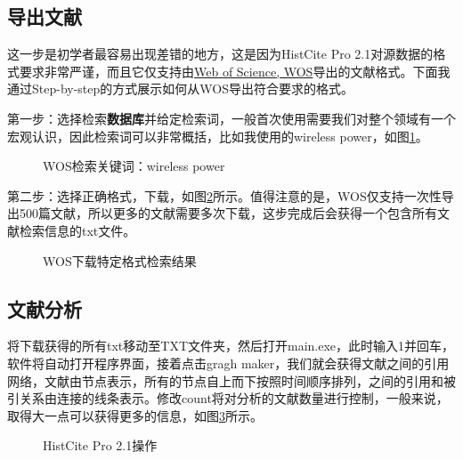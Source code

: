 \documentclass[UTF8,oneside]{ctexbook}
\begin{document}
\subsection{导出文献}
这一步是初学者最容易出现差错的地方，这是因为HistCite Pro 2.1对源数据的格式要求非常严谨，而且它仅支持由\href{http://apps.webofknowledge.com/UA_GeneralSearch_input.do?product=UA&search_mode=GeneralSearch&SID=6DZxzSnnYfZdzYcWxLr&preferencesSaved=}{Web of Science, WOS}导出的文献格式。下面我通过Step-by-step的方式展示如何从WOS导出符合要求的格式。

第一步：选择检索{\bf 数据库}并给定检索词，一般首次使用需要我们对整个领域有一个宏观认识，因此检索词可以非常概括，比如我使用的wireless power，如图\ref{fig:1}。

\begin{figure}[!htb]
	\centering
	\vspace{-0.3cm}
	\caption{WOS检索关键词：wireless power}\label{fig:1}
\end{figure}

第二步：选择正确格式，下载，如图\ref{fig:2}所示。值得注意的是，WOS仅支持一次性导出500篇文献，所以更多的文献需要多次下载，这步完成后会获得一个包含所有文献检索信息的txt文件。

\begin{figure}[!htb]
	\centering
	\vspace{-0.3cm}
	\caption{WOS下载特定格式检索结果}\label{fig:2}
\end{figure}

\subsection{文献分析}
将下载获得的所有txt移动至TXT文件夹，然后打开main.exe，此时输入1并回车，软件将自动打开程序界面，接着点击gragh maker，我们就会获得文献之间的引用网络，文献由节点表示，所有的节点自上而下按照时间顺序排列，之间的引用和被引关系由连接的线条表示。修改count将对分析的文献数量进行控制，一般来说，取得大一点可以获得更多的信息，如图\ref{fig:3}所示。

\begin{figure}[!htb]
	\centering
	\vspace{-0.3cm}
	\caption{HistCite Pro 2.1操作}\label{fig:3}
\end{figure}
\end{document}
